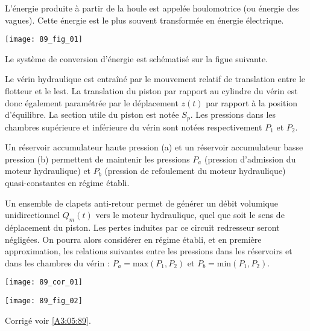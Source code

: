 \normaltrue \difficilefalse \tdifficilefalse
\correctionfalse

\setcounter{question}{0}
\ifcorrection
\else
{}
\fi



\ifprof
\else
L’énergie produite à partir de la houle est appelée houlomotrice (ou énergie des vagues). Cette énergie est le plus souvent
transformée en énergie électrique.

\begin{center}
\texttt{[image: 89\_fig\_01]}
\end{center}

Le système de conversion d'énergie est schématisé sur la figue suivante.

Le vérin hydraulique est entraîné par le mouvement relatif de translation entre le flotteur et le lest.
La translation du piston par rapport au cylindre du vérin est donc également paramétrée par le
déplacement $z(t)$ par rapport à la position d’équilibre. La section utile du piston est notée $S_p$. Les
pressions dans les chambres supérieure et inférieure du vérin sont notées respectivement $P_1$ et $P_2$.

Un réservoir accumulateur haute pression (a) et un réservoir accumulateur basse pression (b)
permettent de maintenir les pressions $P_a$ (pression d'admission du moteur hydraulique) et $P_b$
(pression de refoulement du moteur hydraulique) quasi-constantes en régime établi.

Un ensemble de clapets anti-retour permet de générer un débit volumique unidirectionnel $Q_m(t)$
vers le moteur hydraulique, quel que soit le sens de déplacement du piston. Les pertes induites par
ce circuit redresseur seront négligées. On pourra alors considérer en régime établi, et en première
approximation, les relations suivantes entre les pressions dans les réservoirs et dans les chambres du
vérin : $P_a = \text{max} \left(P_1,P_2\right)$ et $P_b = \text{min} \left(P_1,P_2\right)$.

\fi


\ifprof
\begin{corrige}
\begin{center}
\texttt{[image: 89\_cor\_01]}
\end{center}
\end{corrige}
\else

\begin{center}
\texttt{[image: 89\_fig\_02]}
\end{center}
\fi

\ifprof
\else
\begin{flushright}
\footnotesize{Corrigé  voir \ref{A3:05:89}.}
\end{flushright}%
\fi